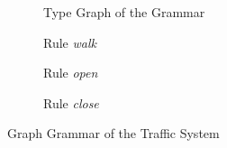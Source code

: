 \begin{figure}[!ht]
  \centering
  \begin{subfigure}[t]{.5\textwidth}
    \centerline{}
    \caption{Type Graph of the Grammar}\label{fig:tests:traffic-type-graph}
  \end{subfigure}
  \begin{subfigure}[t]{.5\textwidth}
    \centerline{}
    \caption{Rule \emph{walk}}
  \end{subfigure}
  \begin{subfigure}[t]{.5\textwidth}
    \centerline{}
    \caption{Rule \emph{open}}
  \end{subfigure}%
  \begin{subfigure}[t]{.5\textwidth}
    \centerline{}
    \caption{Rule \emph{close}}
  \end{subfigure}
  \caption{Graph Grammar of the Traffic System}\label{fig:tests:grammar-traffic}
\end{figure}

